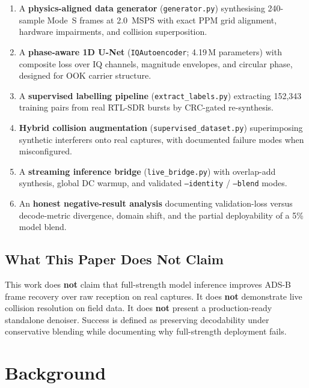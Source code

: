 \documentclass[11pt,a4paper]{article}
\begin{document}
\begin{enumerate}[leftmargin=*]
  \item A \textbf{physics-aligned data generator} (\texttt{generator.py})
        synthesising 240-sample Mode~S frames at 2.0~MSPS with exact PPM grid
        alignment, hardware impairments, and collision superposition.
  \item A \textbf{phase-aware 1D U-Net} (\texttt{IQAutoencoder}; 4.19\,M
        parameters) with composite loss over IQ channels, magnitude envelopes,
        and circular phase, designed for OOK carrier structure.
  \item A \textbf{supervised labelling pipeline} (\texttt{extract\_labels.py})
        extracting 152{,}343 training pairs from real RTL-SDR bursts by
        CRC-gated re-synthesis.
  \item \textbf{Hybrid collision augmentation} (\texttt{supervised\_dataset.py})
        superimposing synthetic interferers onto real captures, with documented
        failure modes when misconfigured.
  \item A \textbf{streaming inference bridge} (\texttt{live\_bridge.py}) with
        overlap-add synthesis, global DC warmup, and validated
        \texttt{--identity} / \texttt{--blend} modes.
  \item An \textbf{honest negative-result analysis} documenting
        validation-loss versus decode-metric divergence, domain shift, and the
        partial deployability of a 5\% model blend.
\end{enumerate}

\subsection{What This Paper Does Not Claim}

This work does \textbf{not} claim that full-strength model inference improves ADS-B
frame recovery over raw reception on real captures. It does \textbf{not}
demonstrate live collision resolution on field data. It does \textbf{not} present a
production-ready standalone denoiser. Success is defined as preserving
decodability under conservative blending while documenting why full-strength
deployment fails.

\section{Background}
\end{document}
